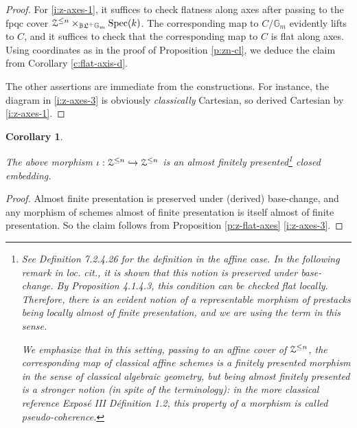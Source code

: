 \documentclass[reqno,11pt]{amsart}
\numberwithin{equation}{subsection}
\newtheorem{cor}[thm]{Corollary}
\theoremstyle{remark}
\newcommand{\into}{\hookrightarrow}
\newcommand{\bB}{{\mathbb B}}
\newcommand{\bG}{{\mathbb G}}
\newcommand{\sZ}{{\EuScript Z}}
\newcommand{\fL}{{\mathfrak L}}
\newcommand{\on}{\operatorname}
\newcommand{\Spec}{\on{Spec}}
\begin{document}
\begin{proof}

For \eqref{i:z-axes-1}, it suffices to check
flatness along axes after passing to the fpqc cover
$\sZ^{\leq n} \times_{\bB \fL^+ \bG_m} \Spec(k)$.
The corresponding map to $C/\bG_m$ evidently lifts
to $C$, and it suffices to check that the corresponding
map to $C$ is flat along axes. Using coordinates
as in the proof of 
Proposition \ref{p:zn-cl}, we deduce the claim
from Corollary \ref{c:flat-axis-d}.

The other assertions are immediate from the constructions.
For instance, the diagram in 
\eqref{i:z-axes-3} is obviously \emph{classically}
Cartesian, so derived Cartesian by \eqref{i:z-axes-1}. 

\end{proof}


\begin{cor}\label{c:iota-afp}

The above morphism
$\iota:\sZ^{\leq n} \into \sZ^{\leq n}$ is an
almost finitely presented\footnote{See 
\cite{higheralgebra} Definition 7.2.4.26
for the definition in the affine case. 
In the following remark in \emph{loc. cit}., it is shown
that this notion is preserved under base-change.
By \cite{sag} Proposition 4.1.4.3, this condition
can be checked flat locally. Therefore, there
is an evident notion of a representable
morphism of prestacks being locally almost of finite
presentation, and we are using the term in this
sense.

We emphasize that in this setting,
passing to an affine cover of $\sZ^{\leq n}$,
the corresponding map of classical affine
schemes is a finitely presented morphism in the sense
of classical algebraic geometry,
but being almost finitely presented is a 
\emph{stronger} notion (in spite of the terminology):
in the more classical reference \cite{sga-6} 
Expos\'e III D\'efinition 1.2, this property
of a morphism is called \emph{pseudo-coherence}.}
closed embedding.

\end{cor}

\begin{proof}

Almost finite presentation is preserved under
(derived) base-change, and any morphism of 
schemes almost of finite presentation 
is itself almost of finite presentation.
So the claim follows from 
Proposition \ref{p:z-flat-axes} \eqref{i:z-axes-3}.

\end{proof}
\end{document}
